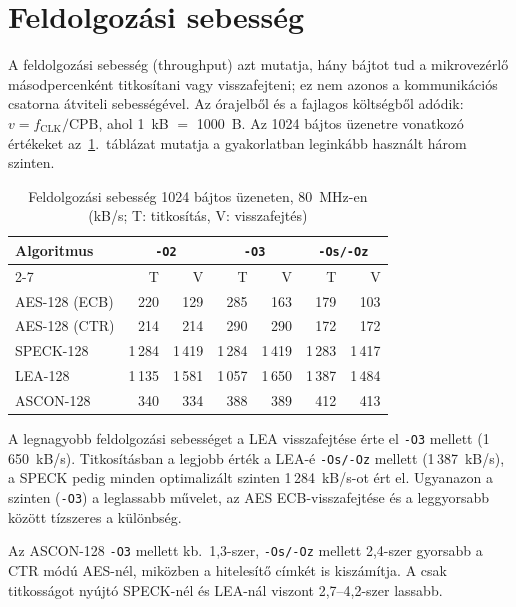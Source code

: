 \documentclass[a4paper,12pt]{report}
\theoremstyle{definition}
\theoremstyle{remark}
\begin{document}
\section{Feldolgozási sebesség}\label{sec:atvitel}

A feldolgozási sebesség (throughput) azt mutatja, hány bájtot tud a mikrovezérlő másodpercenként titkosítani vagy visszafejteni; ez nem azonos a kommunikációs csatorna átviteli sebességével. Az órajelből és a fajlagos költségből adódik: $v = f_{\mathrm{CLK}}/\mathrm{CPB}$, ahol 1~kB $=$ 1000~B. Az 1024 bájtos üzenetre vonatkozó értékeket az~\ref{tab:throughput}.~táblázat mutatja a gyakorlatban leginkább használt három szinten.

\begin{table}[htbp]
    \centering
    \small
    \caption{Feldolgozási sebesség 1024 bájtos üzeneten, 80~MHz-en (kB/s; T: titkosítás, V: visszafejtés)}
    \label{tab:throughput}
    \begin{tabular}{|l|r|r|r|r|r|r|}
        \hline
        \textbf{Algoritmus} & \multicolumn{2}{c|}{\textbf{\texttt{-O2}}} & \multicolumn{2}{c|}{\textbf{\texttt{-O3}}} & \multicolumn{2}{c|}{\textbf{\texttt{-Os/-Oz}}} \\ \cline{2-7}
        & T & V & T & V & T & V \\ \hline
        AES-128 (ECB) & 220    & 129    & 285    & 163    & 179    & 103    \\ \hline
        AES-128 (CTR) & 214    & 214    & 290    & 290    & 172    & 172    \\ \hline
        SPECK-128     & 1\,284 & 1\,419 & 1\,284 & 1\,419 & 1\,283 & 1\,417 \\ \hline
        LEA-128       & 1\,135 & 1\,581 & 1\,057 & 1\,650 & 1\,387 & 1\,484 \\ \hline
        ASCON-128     & 340    & 334    & 388    & 389    & 412    & 413    \\ \hline
    \end{tabular}
\end{table}

A legnagyobb feldolgozási sebességet a LEA visszafejtése érte el \texttt{-O3} mellett (1\,650~kB/s). Titkosításban a legjobb érték a LEA-é \texttt{-Os/-Oz} mellett (1\,387~kB/s), a SPECK pedig minden optimalizált szinten 1\,284~kB/s-ot ért el. Ugyanazon a szinten (\texttt{-O3}) a leglassabb művelet, az AES ECB-visszafejtése és a leggyorsabb között tízszeres a különbség.

Az ASCON-128 \texttt{-O3} mellett kb.\ 1,3-szer, \texttt{-Os/-Oz} mellett 2,4-szer gyorsabb a CTR módú AES-nél, miközben a hitelesítő címkét is kiszámítja. A csak titkosságot nyújtó SPECK-nél és LEA-nál viszont 2,7--4,2-szer lassabb.
\end{document}
